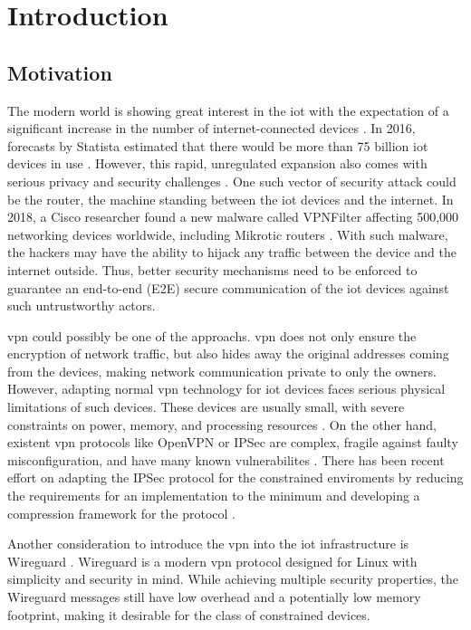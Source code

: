 \chapter{Introduction}
\section{Motivation}
  The modern world is showing great interest in the \gls{iot} with the expectation
  of a significant increase in the number of internet-connected devices \cite{things}. In 2016, forecasts by 
  Statista estimated that there would be more than 75 billion \gls{iot} devices in use \cite{stat}. 
  However, this rapid, unregulated expansion also comes with serious privacy and security challenges \cite{chals}.
  One such vector of security attack could be the router, the machine standing between the \gls{iot}
  devices and the internet. In 2018, a Cisco researcher found a new malware called VPNFilter
  affecting 500,000 networking devices worldwide, including Mikrotic routers \cite{router}. 
  With such malware, the hackers may have the ability to hijack any traffic between
  the device and the internet outside. Thus, better security mechanisms need to be enforced
  to guarantee an end-to-end (E2E) secure communication of the \gls{iot} devices against such
  untrustworthy actors.

  \gls{vpn} could possibly be one of the approachs. \gls{vpn} does not only 
  ensure the encryption of network traffic, but also hides away the original addresses coming
  from the devices, making network communication private to only the owners. However, adapting
  normal \gls{vpn} technology for \gls{iot} devices faces serious physical limitations of such devices.
  These devices are usually small, with severe constraints on power, memory, 
  and processing resources \cite{rfc7228}. On the other hand, existent \gls{vpn} protocols like OpenVPN or 
  IPSec are complex, fragile against faulty misconfiguration, and have many known vulnerabilites \cite{pwu}. 
  There has been recent effort on adapting the IPSec protocol for the constrained enviroments by
  reducing the requirements for an implementation to the minimum \cite{rfc9333} and developing
  a compression framework for the protocol \cite{ietf-ipsecme-diet-esp-01}. 

  Another consideration to introduce the \gls{vpn} into the \gls{iot} infrastructure is Wireguard \cite{wireguard}.
  Wireguard is a modern \gls{vpn} protocol designed for Linux with simplicity and security in mind.
  While achieving multiple security properties, the Wireguard messages still have low overhead 
  and a potentially low memory footprint, making it desirable for the class of constrained devices.

